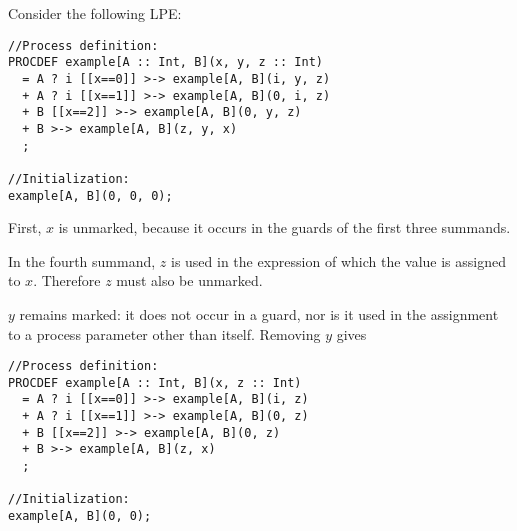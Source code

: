 Consider the following LPE:

\begin{lstlisting}
//Process definition:
PROCDEF example[A :: Int, B](x, y, z :: Int)
  = A ? i [[x==0]] >-> example[A, B](i, y, z)
  + A ? i [[x==1]] >-> example[A, B](0, i, z)
  + B [[x==2]] >-> example[A, B](0, y, z)
  + B >-> example[A, B](z, y, x)
  ;

//Initialization:
example[A, B](0, 0, 0);
\end{lstlisting}

First, $x$ is unmarked, because it occurs in the guards of the first three summands.

In the fourth summand, $z$ is used in the expression of which the value is assigned to $x$.
Therefore $z$ must also be unmarked.

$y$ remains marked: it does not occur in a guard, nor is it used in the assignment to a process parameter other than itself.
Removing $y$ gives

\begin{lstlisting}
//Process definition:
PROCDEF example[A :: Int, B](x, z :: Int)
  = A ? i [[x==0]] >-> example[A, B](i, z)
  + A ? i [[x==1]] >-> example[A, B](0, z)
  + B [[x==2]] >-> example[A, B](0, z)
  + B >-> example[A, B](z, x)
  ;

//Initialization:
example[A, B](0, 0);
\end{lstlisting}



